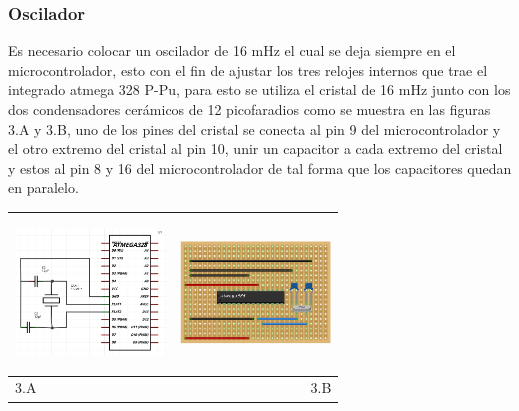 \documentclass[12]{article}
\newenvironment{Figure}
{\par\medskip\noindent\minipage{\linewidth}}
{\endminipage\par\medskip}
\begin{document}
\begin{multicols}{2}
\subsubsection{Oscilador}
Es necesario colocar un oscilador de 16 mHz el cual se deja siempre en el microcontrolador, esto  con el fin de ajustar los tres relojes internos que trae el integrado atmega 328 P-Pu, para esto se utiliza el cristal de 16 mHz junto con los dos condensadores cerámicos de 12 picofaradios como se muestra en las figuras 3.A y 3.B, uno de los pines del cristal se conecta al pin 9 del microcontrolador y el otro extremo del cristal al pin 10, unir un capacitor a cada extremo del cristal y estos al pin 8 y 16 del microcontrolador de tal forma que los capacitores quedan en paralelo.\\
\begin{Figure}
\center
\begin{tabular}{|l|r|}
\hline
\includegraphics[width=4cm, height=4cm]{img/oscilaesq.png} & \includegraphics[width=4cm, height=4cm]{img/oscilapro.png} \\ \hline
3.A & 3.B \\ \hline
\end{tabular}
\label{fig:g3}
\end{Figure}

\end{multicols}
\end{document}
